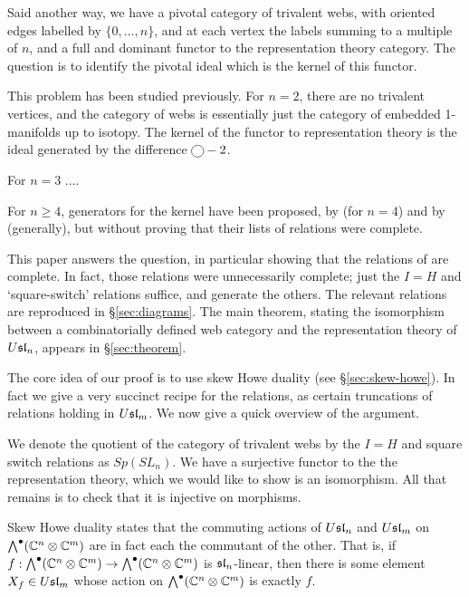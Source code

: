 \documentclass[11pt,leqno]{article}
\begin{document}
Said another way, we have a pivotal category of trivalent webs, with oriented edges labelled by $\{0, \ldots, n\}$, and at each vertex the labels summing to a multiple of $n$, and a full and dominant functor to the representation theory category. The question is to identify the pivotal ideal which is the kernel of this functor.

This problem has been studied previously. For $n=2$, there are no trivalent vertices, and the category of webs is essentially just the category of embedded 1-manifolds up to isotopy. The kernel of the functor to representation theory is the ideal generated by the difference $\tikz[baseline=-2pt]{\node[draw,circle] {};} - 2$. 

For $n=3$ .... 

For $n \geq 4$, generators for the kernel have been proposed, by \cite{math.QA/0310143} (for $n=4$) and by \cite{0704.1503} (generally), but without proving that their lists of relations were complete.

This paper answers the question, in particular showing that the relations of \cite{0704.1503} are complete. In fact, those relations were unnecessarily complete; just the $I=H$ and `square-switch' relations suffice, and generate the others. The relevant relations are reproduced in \S\ref{sec:diagrams}.
The main theorem, stating the isomorphism between a combinatorially defined web category and the representation theory of $\Usl{n}$, appears in \S \ref{sec:theorem}.

The core idea of our proof is to use skew Howe duality (see \S \ref{sec:skew-howe}). In fact we give a very succinct recipe for the relations, as certain truncations of relations holding in $\Usl{m}$. We now give a quick overview of the argument.

We denote the quotient of the category of trivalent webs by the $I=H$ and square switch relations as $Sp(SL_n)$. We have a surjective functor to the the representation theory, which we would like to show is an isomorphism. All that remains is to check that it is injective on morphisms.

Skew Howe duality states that the commuting actions of $\Usl{n}$ and $\Usl{m}$ on $\Alt^\bullet(\mathbb{C}^n \tensor \mathbb{C}^m)$ are in fact each the commutant of the other. That is, if  $f: \Alt^\bullet(\mathbb{C}^n \tensor \mathbb{C}^m) \to \Alt^\bullet(\mathbb{C}^n \tensor \mathbb{C}^m)$ is $\sl{n}$-linear, then there is some element $X_f \in \Usl{m}$ whose action on  $\Alt^\bullet(\mathbb{C}^n \tensor \mathbb{C}^m)$ is exactly $f$.
\end{document}
